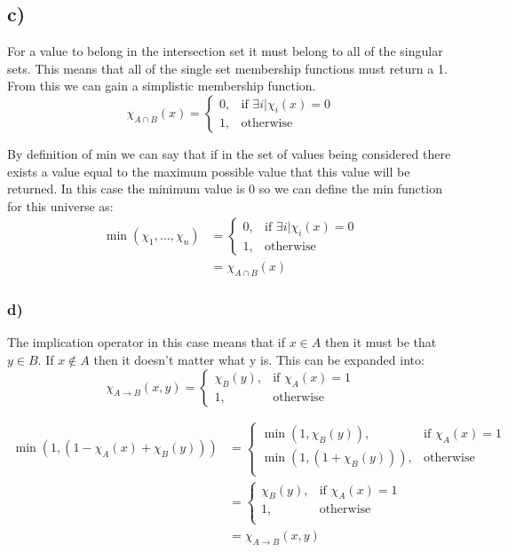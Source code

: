 \documentclass{article}
\begin{document}
\subsection*{c)}
For a value to belong in the intersection set it must belong to all of the singular sets. This means that all of the single set membership functions must return a 1. From this we can gain a simplistic membership function.
\[
	\chi_{A\cap B}(x) =
	\begin{cases}
		0,& \text{if } \exists i | \chi_i(x) = 0 \\
		1,& \text{otherwise}
	\end{cases}
\]

By definition of min we can say that if in the set of values being considered there exists a value equal to the maximum possible value that this value will be returned. In this case the minimum value is 0 so we can define the min function for this universe as:
\begin{align*}
\min(\chi_1, \dots, \chi_n) &=
	\begin{cases}
		0,& \text{if } \exists i | \chi_i(x) = 0 \\
		1,& \text{otherwise}
	\end{cases}\\
	&= \chi_{A\cap B}(x)
\end{align*}

\subsubsection*{d)}
The implication operator in this case means that if $x \in A$ then it must be that $y \in B$. If $x \notin A$ then it doesn't matter what y is. This can be expanded into:
\[
	\chi_{A\rightarrow B}(x,y) =
	\begin{cases}
		\chi_B(y),& \text{if } \chi_A(x) = 1\\
		1, & \text{otherwise}
	\end{cases}
\]

\begin{align*}
	\min(1, (1-\chi_A(x) + \chi_B(y)))
	&=
	\begin{cases}
		\min(1, \chi_B(y)), & \text{if } \chi_A(x) = 1\\
		\min(1,(1 + \chi_B(y))), & \text{otherwise}\\
	\end{cases}\\
	&=
	\begin{cases}
		\chi_B(y), & \text{if } \chi_A(x) = 1\\
		1, & \text{otherwise}\\
	\end{cases}\\
	&= \chi_{A\rightarrow B}(x,y)
\end{align*}
\end{document}
